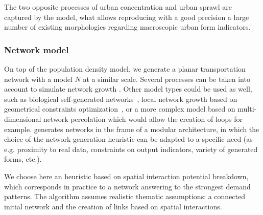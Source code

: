 \documentclass{bmcart}
\begin{document}
The two opposite processes of urban concentration and urban sprawl are captured by the model, what allows reproducing with a good precision a large number of existing morphologies regarding macroscopic urban form indicators.


\subsubsection*{Network model}


On top of the population density model, we generate a planar transportation network with a model $N$ at a similar scale. Several processes can be taken into account to simulate network growth \cite{raimbault2018multi}. Other model types could be used as well, such as biological self-generated networks~\cite{tero2010rules}, local network growth based on geometrical constraints optimization~\cite{courtat2011mathematics}, or a more complex model based on multi-dimensional network percolation \cite{raimbault2019multi} which would allow the creation of loops for example. \cite{raimbault2018multi} generates networks in the frame of a modular architecture, in which the choice of the network generation heuristic can be adapted to a specific need (as e.g. proximity to real data, constraints on output indicators, variety of generated forms, etc.).

We choose here an heuristic based on spatial interaction potential breakdown, which corresponds in practice to a network answering to the strongest demand patterns. The algorithm assumes realistic thematic assumptions: a connected initial network and the creation of links based on spatial interactions.
\end{document}
